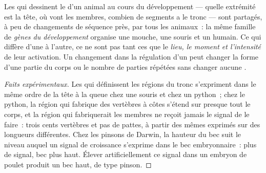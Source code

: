\begin{proposition}\label{prop:g12:diversification-of-life:development}
Les  qui dessinent le  d'un animal au cours du
développement --- quelle extrémité est la tête, où vont les membres,
combien de segments a le tronc --- sont partagés, à peu de changements
de séquence près, par tous les animaux~: la même famille de
\emph{gènes du développement} organise une
mouche, une souris et un humain. Ce qui diffère d'une  à l'autre,
ce ne sont pas tant ces  que le \emph{lieu, le moment et
l'intensité} de leur activation. Un changement dans la régulation d'un
 peut changer la forme d'une partie du corps ou le
nombre de parties répétées sans changer aucune .
\end{proposition}
\begin{proof}[Faits expérimentaux]
Les  qui définissent les régions du tronc s'expriment dans le même
ordre de la tête à la queue chez une souris et chez un python~; chez le
python, la région qui fabrique des vertèbres à côtes s'étend sur
presque tout le corps, et la région qui fabriquerait les membres ne
reçoit jamais le signal de le faire~: trois cents vertèbres et pas de
pattes, à partir des mêmes  exprimés sur des longueurs
différentes. Chez les pinsons de Darwin, la hauteur du bec suit le
niveau auquel un signal de croissance s'exprime dans le bec
embryonnaire~: plus de signal, bec plus haut. Élever artificiellement
ce signal dans un embryon de poulet produit un bec haut, de type
pinson.
\end{proof}

